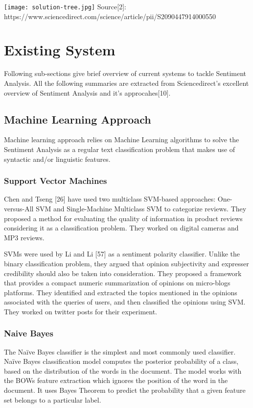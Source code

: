 \texttt{[image: solution-tree.jpg]}\newline
Source[2]: https://www.sciencedirect.com/science/article/pii/S2090447914000550


\section{Existing System}
Following sub-sections give brief overview of current systems to tackle Sentiment Analysis. All the following summaries are extracted from Sciencedirect's excellent overview of Sentiment Analysis and it's approcahes[10].


\subsection{Machine Learning Approach}
Machine learning approach relies on Machine Learning algorithms to solve the Sentiment Analysis as a regular text classification problem that makes use of syntactic and/or linguistic features.

\subsubsection{Support Vector Machines}
Chen and Tseng [26] have used two multiclass SVM-based approaches: One-versus-All SVM and Single-Machine Multiclass SVM to categorize reviews. They proposed a method for evaluating the quality of information in product reviews considering it as a classification problem. They worked on digital cameras and MP3 reviews.

SVMs were used by Li and Li [57] as a sentiment polarity classifier. Unlike the binary classification problem, they argued that opinion subjectivity and expresser credibility should also be taken into consideration. They proposed a framework that provides a compact numeric summarization of opinions on micro-blogs platforms. They identified and extracted the topics mentioned in the opinions associated with the queries of users, and then classified the opinions using SVM. They worked on twitter posts for their experiment.

\subsubsection{Naive Bayes}
The Naïve Bayes classifier is the simplest and most commonly used classifier. Naïve Bayes classification model computes the posterior probability of a class, based on the distribution of the words in the document. The model works with the BOWs feature extraction which ignores the position of the word in the document. It uses Bayes Theorem to predict the probability that a given feature set belongs to a particular label.

